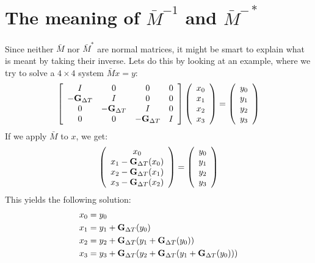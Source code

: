 \documentclass[11pt,a4paper]{article}
\begin{document}
\section{The meaning of $\bar{M}^{-1}$ and $\bar{M}^{-*}$}
Since neither $\bar{M}$ nor $\bar{M}^{*}$ are normal matrices, it might be smart to explain what is meant by taking their inverse. Lets do this by looking at an example, where we try to solve a $4\times 4$ system $\bar{M}x = y$:
\begin{align}
\left[ \begin{array}{cccc}
   I & 0 & 0 & 0 \\  
   -\bold{G}_{\Delta T} & I & 0 & 0 \\ 
   0 &-\bold{G}_{\Delta T} & I  & 0 \\
   0 &0 &-\bold{G}_{\Delta T} & I   \\
   \end{array}  \right]
   \left( \begin{array}{c}
   x_0 \\
   x_1 \\
   x_2 \\
   x_3 \\
   \end{array} \right) =
   \left( \begin{array}{c}
   y_0 \\
   y_1 \\
   y_2 \\
   y_3 \\
   \end{array} \right)	
\end{align}  
If we apply $\bar{M}$ to $x$, we get:
\begin{align}
\left( \begin{array}{c}
   x_0 \\
   x_1 -\bold{G}_{\Delta T}(x_0) \\
   x_2 -\bold{G}_{\Delta T}(x_1)\\
   x_3 -\bold{G}_{\Delta T}(x_2)\\
   \end{array} \right) =
   \left( \begin{array}{c}
   y_0 \\
   y_1 \\
   y_2 \\
   y_3 \\
   \end{array} \right)
\end{align}
This yields the following solution:
\begin{align*}
x_0 &=y_0 \\
x_1 &=y_1 + \bold{G}_{\Delta T}(y_0) \\
x_2 &=y_2 + \bold{G}_{\Delta T}(y_1 + \bold{G}_{\Delta T}(y_0)) \\
x_3 &=y_3 + \bold{G}_{\Delta T}(y_2 + \bold{G}_{\Delta T}(y_1 + \bold{G}_{\Delta T}(y_0))) 
\end{align*}
\end{document}
